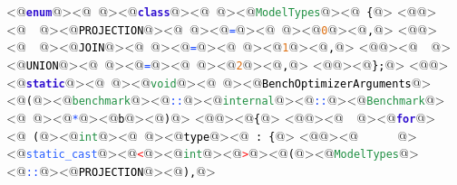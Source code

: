 <@\textcolor[HTML]{3010CF}{\textbf{\texttt{enum}}}@><@\textcolor[HTML]{000000}{\texttt{\ }}@><@\textcolor[HTML]{3010CF}{\textbf{\texttt{class}}}@><@\textcolor[HTML]{000000}{\texttt{\ }}@><@\textcolor[HTML]{1F8F42}{\texttt{ModelTypes}}@><@\textcolor[HTML]{000000}{\texttt{\ \{}}@>
<@\textcolor[HTML]{000000}{\texttt{}}@><@\textcolor[HTML]{000000}{\texttt{\ \ }}@><@\textcolor[HTML]{000000}{\texttt{PROJECTION}}@><@\textcolor[HTML]{000000}{\texttt{\ }}@><@\textcolor[HTML]{1041FF}{\texttt{=}}@><@\textcolor[HTML]{000000}{\texttt{\ }}@><@\textcolor[HTML]{DE6F10}{\texttt{0}}@><@\textcolor[HTML]{000000}{\texttt{,}}@>
<@\textcolor[HTML]{000000}{\texttt{}}@><@\textcolor[HTML]{000000}{\texttt{\ \ }}@><@\textcolor[HTML]{000000}{\texttt{JOIN}}@><@\textcolor[HTML]{000000}{\texttt{\ }}@><@\textcolor[HTML]{1041FF}{\texttt{=}}@><@\textcolor[HTML]{000000}{\texttt{\ }}@><@\textcolor[HTML]{DE6F10}{\texttt{1}}@><@\textcolor[HTML]{000000}{\texttt{,}}@>
<@\textcolor[HTML]{000000}{\texttt{}}@><@\textcolor[HTML]{000000}{\texttt{\ \ }}@><@\textcolor[HTML]{000000}{\texttt{UNION}}@><@\textcolor[HTML]{000000}{\texttt{\ }}@><@\textcolor[HTML]{1041FF}{\texttt{=}}@><@\textcolor[HTML]{000000}{\texttt{\ }}@><@\textcolor[HTML]{DE6F10}{\texttt{2}}@><@\textcolor[HTML]{000000}{\texttt{,}}@>
<@\textcolor[HTML]{000000}{\texttt{}}@><@\textcolor[HTML]{000000}{\texttt{\};}}@>
<@\textcolor[HTML]{000000}{\texttt{}}@>
<@\textcolor[HTML]{3010CF}{\textbf{\texttt{static}}}@><@\textcolor[HTML]{000000}{\texttt{\ }}@><@\textcolor[HTML]{1F8F42}{\texttt{void}}@><@\textcolor[HTML]{000000}{\texttt{\ }}@><@\textcolor[HTML]{000000}{\texttt{BenchOptimizerArguments}}@><@\textcolor[HTML]{000000}{\texttt{(}}@><@\textcolor[HTML]{1F8F42}{\texttt{benchmark}}@><@\textcolor[HTML]{1041FF}{\texttt{::}}@><@\textcolor[HTML]{1F8F42}{\texttt{internal}}@><@\textcolor[HTML]{1041FF}{\texttt{::}}@><@\textcolor[HTML]{1F8F42}{\texttt{Benchmark}}@><@\textcolor[HTML]{000000}{\texttt{\ }}@><@\textcolor[HTML]{1041FF}{\texttt{*}}@><@\textcolor[HTML]{000000}{\texttt{b}}@><@\textcolor[HTML]{000000}{\texttt{)}}@>
<@\textcolor[HTML]{000000}{\texttt{}}@><@\textcolor[HTML]{000000}{\texttt{\{}}@>
<@\textcolor[HTML]{000000}{\texttt{}}@><@\textcolor[HTML]{000000}{\texttt{\ \ }}@><@\textcolor[HTML]{3010CF}{\textbf{\texttt{for}}}@><@\textcolor[HTML]{000000}{\texttt{\ (}}@><@\textcolor[HTML]{1F8F42}{\texttt{int}}@><@\textcolor[HTML]{000000}{\texttt{\ }}@><@\textcolor[HTML]{000000}{\texttt{type}}@><@\textcolor[HTML]{000000}{\texttt{\ :\ \{}}@>
<@\textcolor[HTML]{000000}{\texttt{}}@><@\textcolor[HTML]{000000}{\texttt{\ \ \ \ \ \ }}@><@\textcolor[HTML]{255CFF}{\texttt{static\_cast}}@><@\textcolor[HTML]{FF1010}{\texttt{<}}@><@\textcolor[HTML]{1F8F42}{\texttt{int}}@><@\textcolor[HTML]{FF1010}{\texttt{>}}@><@\textcolor[HTML]{000000}{\texttt{(}}@><@\textcolor[HTML]{1F8F42}{\texttt{ModelTypes}}@><@\textcolor[HTML]{1041FF}{\texttt{::}}@><@\textcolor[HTML]{000000}{\texttt{PROJECTION}}@><@\textcolor[HTML]{000000}{\texttt{),}}@>
